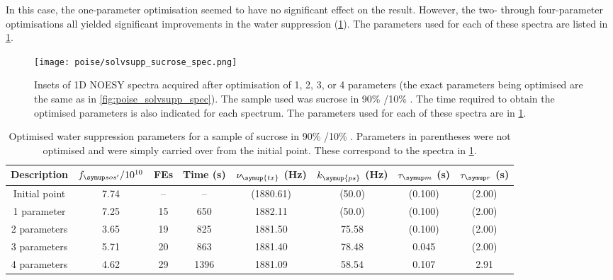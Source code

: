 In this case, the one-parameter optimisation seemed to have no significant effect on the result.
However, the two- through four-parameter optimisations all yielded significant improvements in the water suppression (\cref{fig:poise_solvsupp_sucrose_spec}).
The parameters used for each of these spectra are listed in \cref{tbl:poise_solvsupp_sucrose}.

\begin{figure}[!ht]
    \centering
    \texttt{[image: poise/solvsupp\_sucrose\_spec.png]}
    \caption[1D NOESY spectra of sucrose sample before and after optimisation]{
        Insets of 1D NOESY spectra acquired after optimisation of 1, 2, 3, or 4 parameters (the exact parameters being optimised are the same as in \cref{fig:poise_solvsupp_spec}).
        The sample used was sucrose in 90\% /10\% .
        The time required to obtain the optimised parameters is also indicated for each spectrum.
        The parameters used for each of these spectra are in \cref{tbl:poise_solvsupp_sucrose}.
    }
    \label{fig:poise_solvsupp_sucrose_spec}
\end{figure}

\begin{table}[!htb]
    \centering
    \begin{tabular}{cccccccc}
        \toprule
        Description   & $\fsosre / 10^{10}$ & FEs & Time (\unit{\s}) & $\nu_{\symup{tx}}$ (\unit{\Hz}) & $k_{\symup{ps}}$ (\unit{\Hz}) & $\taum$ (\unit{\s}) & $\taur$ (\unit{\s}) \\
        \hline
        Initial point & 7.74 & -- & --   & (1880.61) & (50.0) & (0.100) & (2.00) \\
        1 parameter   & 7.25 & 15 & 650  & 1882.11   & (50.0) & (0.100) & (2.00) \\
        2 parameters  & 3.65 & 19 & 825  & 1881.50   & 75.58  & (0.100) & (2.00) \\
        3 parameters  & 5.71 & 20 & 863  & 1881.40   & 78.48  & 0.045   & (2.00) \\
        4 parameters  & 4.62 & 29 & 1396 & 1881.09   & 58.54  & 0.107   & 2.91   \\
        \hline
    \end{tabular}
    \caption[Overview of water suppression optimisations on sucrose sample]{
        Optimised water suppression parameters for a sample of sucrose in 90\% /10\% .
        Parameters in parentheses were not optimised and were simply carried over from the initial point.
        These correspond to the spectra in \cref{fig:poise_solvsupp_sucrose_spec}.
    }
    \label{tbl:poise_solvsupp_sucrose}
\end{table}
